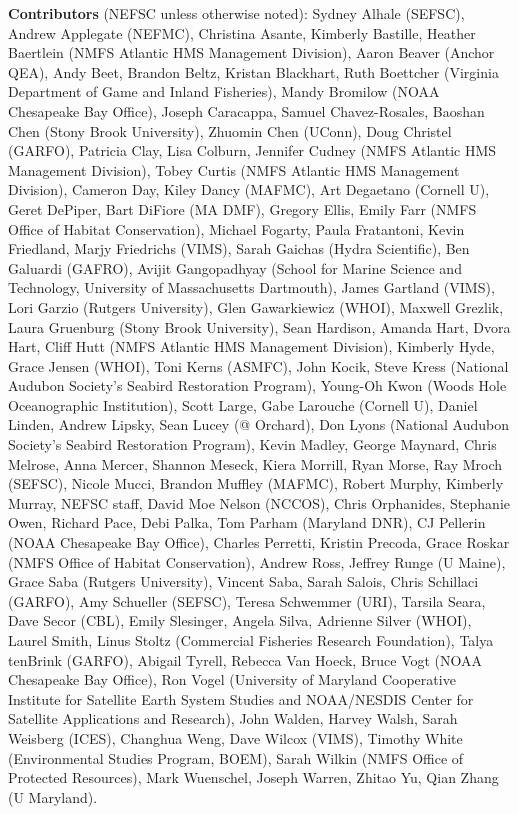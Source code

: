 \documentclass[
  10pt,
]{article}
\begin{document}
\textbf{Contributors} (NEFSC unless otherwise noted): Sydney Alhale (SEFSC), Andrew Applegate (NEFMC), Christina Asante, Kimberly Bastille, Heather Baertlein (NMFS Atlantic HMS Management Division), Aaron Beaver (Anchor QEA), Andy Beet, Brandon Beltz, Kristan Blackhart, Ruth Boettcher (Virginia Department of Game and Inland Fisheries), Mandy Bromilow (NOAA Chesapeake Bay Office), Joseph Caracappa, Samuel Chavez-Rosales, Baoshan Chen (Stony Brook University), Zhuomin Chen (UConn), Doug Christel (GARFO), Patricia Clay, Lisa Colburn, Jennifer Cudney (NMFS Atlantic HMS Management Division), Tobey Curtis (NMFS Atlantic HMS Management Division), Cameron Day, Kiley Dancy (MAFMC), Art Degaetano (Cornell U), Geret DePiper, Bart DiFiore (MA DMF), Gregory Ellis, Emily Farr (NMFS Office of Habitat Conservation), Michael Fogarty, Paula Fratantoni, Kevin Friedland, Marjy Friedrichs (VIMS), Sarah Gaichas (Hydra Scientific), Ben Galuardi (GAFRO), Avijit Gangopadhyay (School for Marine Science and Technology, University of Massachusetts Dartmouth), James Gartland (VIMS), Lori Garzio (Rutgers University), Glen Gawarkiewicz (WHOI), Maxwell Grezlik, Laura Gruenburg (Stony Brook University), Sean Hardison, Amanda Hart, Dvora Hart, Cliff Hutt (NMFS Atlantic HMS Management Division), Kimberly Hyde, Grace Jensen (WHOI), Toni Kerns (ASMFC), John Kocik, Steve Kress (National Audubon Society's Seabird Restoration Program), Young-Oh Kwon (Woods Hole Oceanographic Institution), Scott Large, Gabe Larouche (Cornell U), Daniel Linden, Andrew Lipsky, Sean Lucey (@ Orchard), Don Lyons (National Audubon Society's Seabird Restoration Program), Kevin Madley, George Maynard, Chris Melrose, Anna Mercer, Shannon Meseck, Kiera Morrill, Ryan Morse, Ray Mroch (SEFSC), Nicole Mucci, Brandon Muffley (MAFMC), Robert Murphy, Kimberly Murray, NEFSC staff, David Moe Nelson (NCCOS), Chris Orphanides, Stephanie Owen, Richard Pace, Debi Palka, Tom Parham (Maryland DNR), CJ Pellerin (NOAA Chesapeake Bay Office), Charles Perretti, Kristin Precoda, Grace Roskar (NMFS Office of Habitat Conservation), Andrew Ross, Jeffrey Runge (U Maine), Grace Saba (Rutgers University), Vincent Saba, Sarah Salois, Chris Schillaci (GARFO), Amy Schueller (SEFSC), Teresa Schwemmer (URI), Tarsila Seara, Dave Secor (CBL), Emily Slesinger, Angela Silva, Adrienne Silver (WHOI), Laurel Smith, Linus Stoltz (Commercial Fisheries Research Foundation), Talya tenBrink (GARFO), Abigail Tyrell, Rebecca Van Hoeck, Bruce Vogt (NOAA Chesapeake Bay Office), Ron Vogel (University of Maryland Cooperative Institute for Satellite Earth System Studies and NOAA/NESDIS Center for Satellite Applications and Research), John Walden, Harvey Walsh, Sarah Weisberg (ICES), Changhua Weng, Dave Wilcox (VIMS), Timothy White (Environmental Studies Program, BOEM), Sarah Wilkin (NMFS Office of Protected Resources), Mark Wuenschel, Joseph Warren, Zhitao Yu, Qian Zhang (U Maryland).
\end{document}
